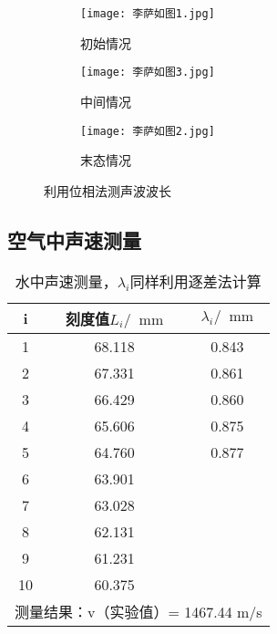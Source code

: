 \documentclass[11pt]{article}
\newcommand*{\unit}[1]{\mathop{}\!\mathrm{#1}}
\newcommand{\mm}{\unit{mm}}
\begin{document}
\begin{figure}[H]
	\centering
    \begin{subfigure}{0.32\textwidth}
		\texttt{[image: 李萨如图1.jpg]}
		\caption{初始情况}
		\label{fig:Lissajous1}
	\end{subfigure}
    \begin{subfigure}{0.32\textwidth}
		\texttt{[image: 李萨如图3.jpg]}
		\caption{中间情况}
		\label{fig:Lissajous3}
	\end{subfigure}
    \begin{subfigure}{0.32\textwidth}
		\texttt{[image: 李萨如图2.jpg]}
		\caption{末态情况}
		\label{fig:Lissajous2}
	\end{subfigure}
	\caption{利用位相法测声波波长}
	\label{fig:Lissajous}
\end{figure}

\subsection{空气中声速测量}
\begin{table}[H]
	\centering
	\begin{tabular}{|ccc|}
		\hline
		\multicolumn{1}{|c|}{i}  & \multicolumn{1}{c|}{刻度值\(L_i/\mm\)}    &     \(\lambda_i/\mm\)              \\ \hline
		\multicolumn{1}{|c|}{1}  & \multicolumn{1}{c|}{68.118} & 0.843             \\ \hline
		\multicolumn{1}{|c|}{2}  & \multicolumn{1}{c|}{67.331} & 0.861             \\ \hline
		\multicolumn{1}{|c|}{3}  & \multicolumn{1}{c|}{66.429} & 0.860             \\ \hline
		\multicolumn{1}{|c|}{4}  & \multicolumn{1}{c|}{65.606} & 0.875             \\ \hline
		\multicolumn{1}{|c|}{5}  & \multicolumn{1}{c|}{64.760} & 0.877             \\ \hline
		\multicolumn{1}{|c|}{6}  & \multicolumn{1}{c|}{63.901} & \multirow{5}{*}{} \\ \cline{1-2}
		\multicolumn{1}{|c|}{7}  & \multicolumn{1}{c|}{63.028} &                   \\ \cline{1-2}
		\multicolumn{1}{|c|}{8}  & \multicolumn{1}{c|}{62.131} &                   \\ \cline{1-2}
		\multicolumn{1}{|c|}{9}  & \multicolumn{1}{c|}{61.231} &                   \\ \cline{1-2}
		\multicolumn{1}{|c|}{10} & \multicolumn{1}{c|}{60.375} &                   \\ \hline
		\multicolumn{3}{|c|}{测量结果：v（实验值）=       1467.44      m/s}                  \\ \hline
	\end{tabular}
	\caption{水中声速测量，\(\lambda_i\)同样利用逐差法计算}
	\label{velocity in water}
\end{table}
\end{document}
